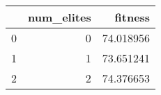\begin{tabular}{lrr}
\toprule
{} &  num\_elites &    fitness \\
\midrule
0 &           0 &  74.018956 \\
1 &           1 &  73.651241 \\
2 &           2 &  74.376653 \\
\bottomrule
\end{tabular}
